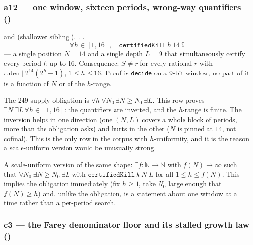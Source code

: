 \subsubsection{a12 --- one window, sixteen periods, wrong-way quantifiers ()}

\begin{thm}
 and
(shallower sibling ). .
.
\[
  \forall h\in[1,16],\quad \mathtt{certifiedKill}\ h\ 14\ 9
\]
--- a single position $N=14$ and a single depth $L=9$ that simultaneously certify every period $h$
up to $16$. Consequence: $S\ne r$ for every rational $r$ with $r.\mathrm{den}\mid 2^{14}(2^h{-}1)$,
$1\le h\le 16$. Proof is \texttt{decide} on a 9-bit window; no part of it is a function of $N$ or of
the $h$-range.
\end{thm}

\begin{rem}
The 249-supply obligation is $\forall h\ \forall N_0\ \exists N\ge N_0\ \exists L$. This row proves
$\exists N\ \exists L\ \forall h\in[1,16]$: the quantifiers are inverted, and the $h$-range is
finite. The inversion helps in one direction (one $(N,L)$ covers a whole block of periods, more
than the obligation asks) and hurts in the other ($N$ is pinned at $14$, not cofinal). This is the
only row in the corpus with $h$-uniformity, and it is the reason a scale-uniform version would be
unusually strong.
\end{rem}

\begin{prop}
A scale-uniform version of the same shape: $\exists f:\mathbb N\to\mathbb N$ with $f(N)\to\infty$
such that $\forall N_0\ \exists N\ge N_0\ \exists L$ with $\mathtt{certifiedKill}\ h\ N\ L$ for all
$1\le h\le f(N)$. This implies the obligation immediately (fix $h\ge1$, take $N_0$ large enough that
$f(N)\ge h$) and, unlike the obligation, is a statement about one window at a time rather than a
per-period search.
\end{prop}

\subsubsection{c3 --- the Farey denominator floor and its stalled growth law ()}

